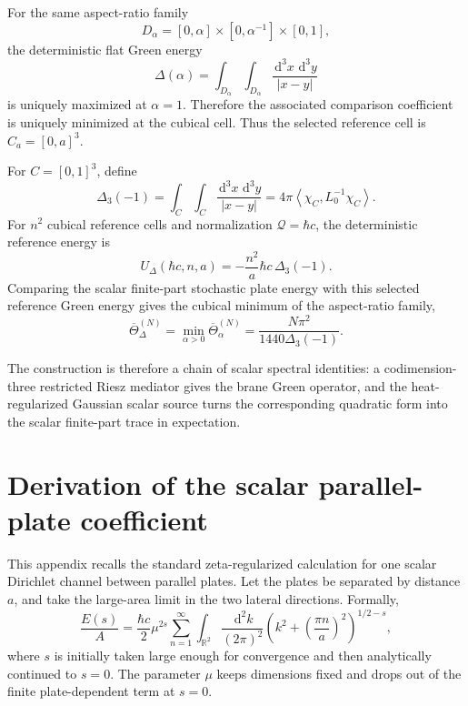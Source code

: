 \documentclass[11pt]{article}
\newcommand{\R}{\mathbb{R}}
\newcommand{\dd}{\,\mathrm{d}}
\newcommand{\braket}[2]{\left\langle #1,#2\right\rangle}
\begin{document}
For the same aspect-ratio family
\[
    D_\alpha=[0,\alpha]\times[0,\alpha^{-1}]\times[0,1],
\]
the deterministic flat Green energy
\[
    \Delta(\alpha)
    =
    \int_{D_\alpha}\int_{D_\alpha}\frac{\dd^3x\,\dd^3y}{|x-y|}
\]
is uniquely maximized at \(\alpha=1\).  Therefore the associated comparison
coefficient is uniquely minimized at the cubical cell.  Thus the selected
reference cell is \(C_a=[0,a]^3\).

For \(C=[0,1]^3\), define
\[
    \Delta_3(-1)
    =
    \int_C\int_C\frac{\dd^3x\,\dd^3y}{|x-y|}
    =
    4\pi\braket{\chi_C}{L_0^{-1}\chi_C}.
\]
For \(n^2\) cubical reference cells and normalization \(\mathcal Q=\hbar c\),
the deterministic reference energy is
\[
    U_{\Delta}(\hbar c,n,a)
    =
    -\frac{n^2}{a}\hbar c\,\Delta_3(-1).
\]
Comparing the scalar finite-part stochastic plate energy with this selected
reference Green energy gives the cubical minimum of the aspect-ratio family,
\[
    \overline{\Theta}_{\Delta}^{(N)}
    =
    \min_{\alpha>0}\overline{\Theta}_{\alpha}^{(N)}
    =
    \frac{N\pi^2}{1440\Delta_3(-1)}.
\]


The construction is therefore a chain of scalar spectral identities: a codimension-three restricted Riesz mediator gives the brane Green operator, and the heat-regularized Gaussian scalar source turns the corresponding quadratic form into the scalar finite-part trace in expectation.

\appendix

\section{Derivation of the scalar parallel-plate coefficient}
\label{app:parallel-zeta}

This appendix recalls the standard zeta-regularized calculation for one scalar Dirichlet channel between parallel plates.  Let the plates be separated by distance $a$, and take the large-area limit in the two lateral directions.  Formally,
\begin{equation}
    \frac{E(s)}{A}
    =\frac{\hbar c}{2}\mu^{2s}\sum_{n=1}^{\infty}\int_{\R^2}\frac{\dd^2k}{(2\pi)^2}
    \left(k^2+\left(\frac{\pi n}{a}\right)^2\right)^{1/2-s},
    \label{eq:zeta-regularized-plate}
\end{equation}
where $s$ is initially taken large enough for convergence and then analytically continued to $s=0$.  The parameter $\mu$ keeps dimensions fixed and drops out of the finite plate-dependent term at $s=0$.
\end{document}
